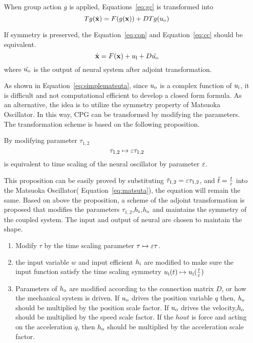 When group action $g$ is applied, Equations~\ref{eq:gc} is transformed into
\begin{equation}
\label{eq:cc}
Tg(\dot{\mathbf{x}})=F(g(\mathbf{x}))+DTg(u_{\mathrm{o}})
\end{equation}




If symmetry is preserved, the Equation~\ref{eq:con} and Equation~\ref{eq:cc} should be equivalent.
\begin{equation}
\label{eq:con}
\dot{\mathbf{x}}=F(\mathbf{x})+u_{\mathrm{l}}+D\tilde{u_{\mathrm{o}}}
\end{equation}
where $\tilde{u_{\mathrm{o}}}$ is the output of neural system after adjoint transformation.

As shown in Equation~\ref{eq:simplematsuta}, since $u_{\mathrm{o}}$ is a complex function of $u_{\mathrm{i}}$,
it is difficult   and not computational efficient to develop a closed form formula.
As an alternative, the idea is to utilize the symmetry property  of Matsuoka Oscillator.
In this way, CPG can be transformed by modifying the parameters.
The transformation scheme is based on the following proposition.


\begin{myprop}
By modifying parameter $\tau_{1,2}$
\[
\tau_{1,2} \mapsto \varepsilon \tau_{1,2}
\]
is equivalent to time scaling of the neural oscillator by parameter $\varepsilon$.
\end{myprop}

This proposition can be easily proved by  substituting $\tilde{\tau}_{1,2}=\varepsilon \tau_{1,2}$, and $\tilde{t}=\frac{t}{\varepsilon}$ into the Matsuoka Oscillator( Equation~\ref{eq:matsuta}), the equation will remain the same.
Based on above the proposition, a scheme of the adjoint transformation is proposed that modifies the parameters $\tau_{1,2}$,$h_{\mathrm{i}}$,$h_{\mathrm{o}}$ and maintains the symmetry of the  coupled system.
The input and output of neural are chosen to maintain the shape.
\begin{enumerate}
\item Modify $\tau$ by the time scaling parameter $\tau \mapsto \varepsilon \tau$.
\item the input variable $w$ and input efficient $h_{\mathrm{i}}$ are modified to make sure the input function satisfy the time scaling symmetry $u_{\mathrm{i}}(t) \mapsto u_{\mathrm{i}}(\frac{t}{\varepsilon})$
\item  Parameters of $h_{\mathrm{o}}$ are modified according to the connection matrix $D$, or how the mechanical system is driven.
If $u_{\mathrm{o}}$ drives the position variable $q$ then, $h_{\mathrm{o}}$ should be multiplied by the position scale factor. 
If $u_{\mathrm{o}}$ drives the velocity,$h_{\mathrm{o}}$ should be  multiplied by the speed scale factor.
If the $hout$ is force and acting on the acceleration $\ddot{q}$, then $h_{\mathrm{o}}$ should be multiplied by the acceleration scale factor.
\end{enumerate}



